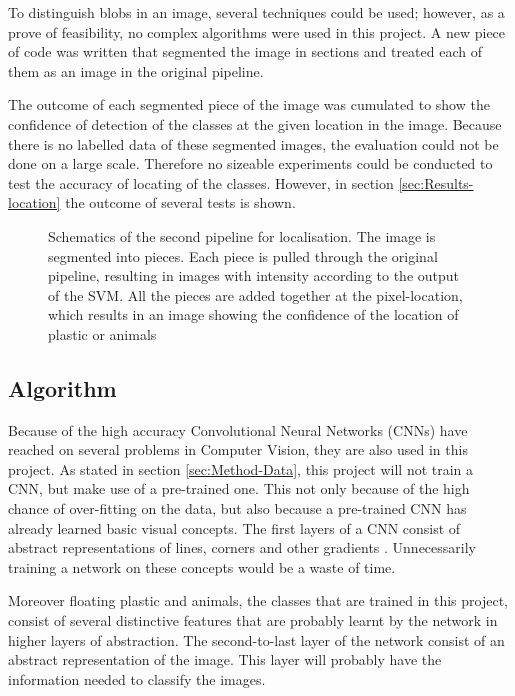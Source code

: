 To distinguish blobs in an image, several techniques could be used; however, as a prove of feasibility, no complex algorithms were used in this project.
A new piece of code was written that segmented the image in sections and treated each of them as an image in the original pipeline.

The outcome of each segmented piece of the image was cumulated to show the confidence of detection of the classes at the given location in the image.
Because there is no labelled data of these segmented images, the evaluation could not be done on a large scale.
Therefore no sizeable experiments could be conducted to test the accuracy of locating of the classes.
However, in section \ref{sec:Results-location} the outcome of several tests is shown.

\begin{figure}%
\centering
\ifx\showfig\undefined

\fi
\caption{Schematics of the second pipeline for localisation. The image is segmented into pieces. Each piece is pulled through the original pipeline, resulting in images with intensity according to the output of the SVM. All the pieces are added together at the pixel-location, which results in an image showing the confidence of the location of plastic or animals}
\label{fig:locpip}
\end{figure}









\iffalse
\subsection{Algorithm}
\label{sec:Method-algotihm}
Because of the high accuracy Convolutional Neural Networks (CNNs) have reached on several problems in Computer Vision, they are also used in this project.
As stated in section \ref{sec:Method-Data}, this project will not train a CNN, but make use of a pre-trained one.
This not only because of the high chance of over-fitting on the data, but also because a pre-trained CNN has already learned basic visual concepts.
The first layers of a CNN consist of abstract representations of lines, corners and other gradients \citep{zeiler2014visualizing}.
Unnecessarily training a network on these concepts would be a waste of time.

Moreover floating plastic and animals, the classes that are trained in this project, consist of several distinctive features that are probably learnt by the network in higher layers of abstraction.
The second-to-last layer of the network consist of an abstract representation of the image.
This layer will probably have the information needed to classify the images. \citeneed

